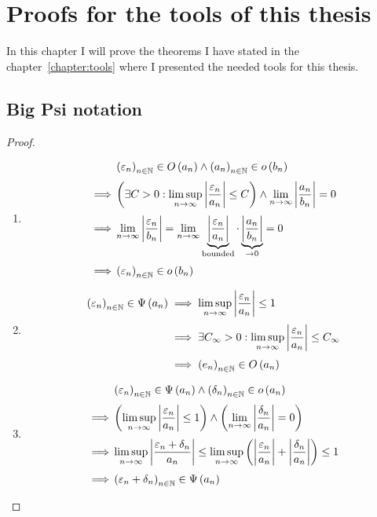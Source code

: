 \chapter{Proofs for the tools of this thesis}

In this chapter I will prove the theorems I have stated in the chapter~\ref{chapter:tools} where I presented the needed tools for this thesis.

\section{Big Psi notation}



\begin{proof} ~
  \begin{enumerate}
    \item \label{proof:littleo_rule}

      \begin{align}
        & \seq{\epsilon_n}\in\bigo{a_n} \land \seq{a_n} \in \littleo{b_n} \nl
        \implies & \left(\exists C > 0: \limsup_{n\to\infty} \abs{\frac{\epsilon_n}{a_n}} \le C\right) \land \lim_{n\to\infty} \abs{\frac{a_n}{b_n}} = 0 \nl
        \implies & \lim_{n\to\infty} \abs{\frac{\epsilon_n}{b_n}} = \lim_{n\to\infty} \underbrace{\abs{\frac{\epsilon_n}{a_n}}}_{\text{bounded}} \cdot \underbrace{\abs{\frac{a_n}{b_n}}}_{\to 0} = 0 \nl
        \implies & \seq{\epsilon_n} \in \littleo{b_n}
      \end{align}
    \item

      \begin{align}
        \seq{\epsilon_n} \in \bigpsi{a_n} & \implies \limsup_{n\to\infty} \abs{\frac{\epsilon_n}{a_n}} \le 1 \nl
                                          & \implies \exists C_\infty > 0 : \limsup_{n\to\infty} \abs{\frac{\epsilon_n}{a_n}} \le C_\infty \nl
                                          & \implies \seq{e_n} \in \bigo{a_n}
      \end{align}

    \item

      \begin{align}
        & \seq{\epsilon_n} \in \bigpsi{a_n} \land \seq{\delta_n} \in \littleo{a_n} \nl
        \implies& \left(\limsup_{n\to\infty} \abs{\frac{\epsilon_n}{a_n}} \le 1\right) \land \left(\lim_{n\to\infty} \abs{\frac{\delta_n}{a_n}} = 0\right) \nl
        \implies& \limsup_{n\to\infty} \abs{\frac{\epsilon_n+\delta_n}{a_n}} \le \limsup_{n\to\infty} \left(\abs{\frac{\epsilon_n}{a_n}}+\abs{\frac{\delta_n}{a_n}}\right) \le 1 \nl
        \implies& \seq{\epsilon_n+\delta_n} \in \bigpsi{a_n}
      \end{align}


\end{enumerate}
\end{proof}
